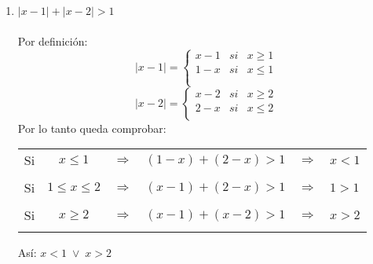 \begin{enumerate}[\bfseries 1.]
\begin{enumerate}[\bfseries (i)]
\item $|x-1|+|x-2|>1$\\\\
Por definición:
\begin{equation}
|x-1| = \left\lbrace
\begin{array}{rcr}
  x-1& si & x\geq 1\\
 1-x& si & x \leq 1\\\\
\end{array}
\right.
\end{equation}
\begin{equation}
|x-2| = \left\lbrace
\begin{array}{rcr}
  x-2& si & x\geq 2\\
 2-x& si & x \leq 2\\
\end{array}
\right.
\end{equation}
Por lo tanto queda comprobar:\\
\begin{center}
\begin{tabular}{c c c r c l}
Si&$x\leq 1$&$\Rightarrow$&$(1-x)+(2-x)>1$&$\Rightarrow$&$x<1$\\\\
Si&$1\leq x\leq 2$&$\Rightarrow$&$(x-1)+(2-x)>1$&$\Rightarrow$&$1>1$\\\\
Si&$x\geq 2$&$\Rightarrow$&$(x-1)+(x-2)>1$&$\Rightarrow$&$x>2$\\\\
\end{tabular}
\end{center}
Así: $x<1 \; \lor \; x>2$\\\\


\end{enumerate}
\end{enumerate}
